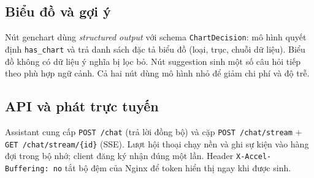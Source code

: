 \subsection{Biểu đồ và gợi ý}

Nút genchart dùng \emph{structured output} với schema \texttt{ChartDecision}: mô
hình quyết định \texttt{has\_chart} và trả danh sách đặc tả biểu đồ (loại, trục,
chuỗi dữ liệu). Biểu đồ không có dữ liệu ý nghĩa bị lọc bỏ. Nút suggestion sinh
một số câu hỏi tiếp theo phù hợp ngữ cảnh. Cả hai nút dùng mô hình nhỏ để giảm chi
phí và độ trễ.

\subsection{API và phát trực tuyến}

Assistant cung cấp \texttt{POST /chat} (trả lời đồng bộ) và cặp
\texttt{POST /chat/stream} + \texttt{GET /chat/stream/\{id\}} (SSE). Lượt hội thoại
chạy nền và ghi sự kiện vào hàng đợi trong bộ nhớ; client đăng ký nhận đúng một
lần. Header \texttt{X-Accel-Buffering: no} tắt bộ đệm của Nginx để token hiển thị
ngay khi được sinh.
